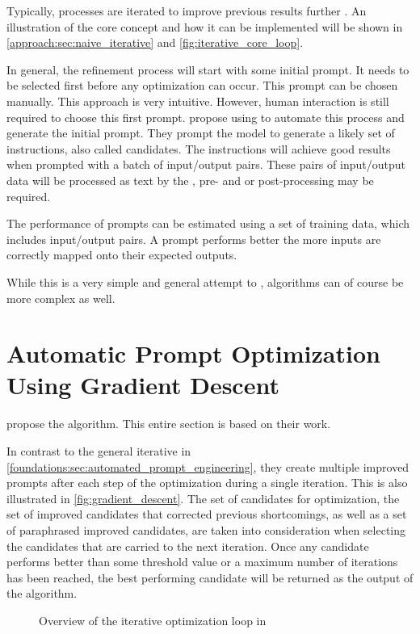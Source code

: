 Typically, \APE processes are iterated to improve previous results further \citeiterative.
An illustration of the core concept and how it can be implemented will be shown in \autoref{approach:sec:naive_iterative} and  \autoref{fig:iterative_core_loop}.

In general, the refinement process will start with some initial prompt.
It needs to be selected first before any optimization can occur.
This prompt can be chosen manually.
This approach is very intuitive.
However, human interaction is still required to choose this first prompt.
 propose using \LLMs to automate this process and generate the initial prompt.
They prompt the model to generate a likely set of instructions, also called candidates.
The instructions will achieve good results when prompted with a batch of input/output pairs.
These pairs of input/output data will be processed as text by the \LLM, pre- and or post-processing may be required.

The performance of prompts can be estimated using a set of training data, which includes input/output pairs.
A prompt performs better the more inputs are correctly mapped onto their expected outputs.

While this is a very simple and general attempt to \APE, algorithms can of course be more complex as well.


\section{Automatic Prompt Optimization Using Gradient Descent}
\label{sec:gradient_descent}
 propose the \ProTeGi algorithm.
This entire section is based on their work.

In contrast to the general iterative \APE in \autoref{foundations:sec:automated_prompt_engineering}, they create multiple improved prompts after each step of the optimization during a single iteration.
This is also illustrated in \autoref{fig:gradient_descent}.
The set of candidates for optimization, the set of improved candidates that corrected previous shortcomings, as well as a set of paraphrased improved candidates, are taken into consideration when selecting the candidates that are carried to the next iteration.
Once any candidate performs better than some threshold value or a maximum number of iterations has been reached, the best performing candidate will be returned as the output of the \ProTeGi algorithm.

\begin{figure}
\centering

\caption{Overview of the iterative optimization loop in~\cite{pryzant2023AutomaticPrompt}}
\label{fig:gradient_descent}
\begin{comment}
TODO: 
\begin{itemize}
    \item add legend
    \item symbolise core loop
\end{itemize}
\end{comment}
\end{figure}

